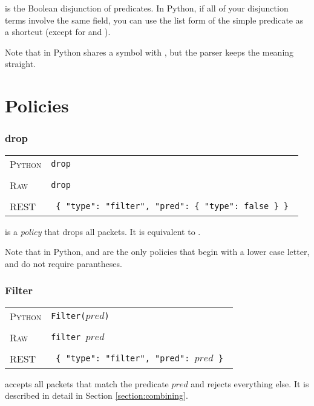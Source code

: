  is the Boolean disjunction of predicates.  In Python, if all of your disjunction terms involve
the same field, you can use the list form of the simple predicate as a shortcut (except for 
 and ). 

Note that in Python  shares a symbol with , but the parser keeps the meaning straight.

\section{Policies}

\subsubsection{drop}

\bigskip
\begin{tabularx}{\linewidth}{lX}
\textsc{Python}   & \texttt{drop} \\ \\
\textsc{Raw}   & \texttt{drop} \\ \\
\textsc{REST} & \texttt{ \{ "type": "filter", "pred": \{ "type": false \} \} } 
\end{tabularx}

 is a \emph{policy} that drops all packets.  It is equivalent to .

Note that in Python,  and  are the only policies that begin with a lower case
letter, and do not require parantheses.  

\subsubsection{Filter}

\bigskip
\begin{tabularx}{\linewidth}{lX}
\textsc{Python}   & \texttt{Filter($pred$)} \\ \\
\textsc{Raw}   & \texttt{filter $pred$} \\ \\
\textsc{REST} & \texttt{ \{ "type": "filter", "pred": $pred$ \} } 
\end{tabularx}

 accepts all packets that match the predicate $pred$ and rejects everything else.
It is described in detail in Section \ref{section:combining}.

